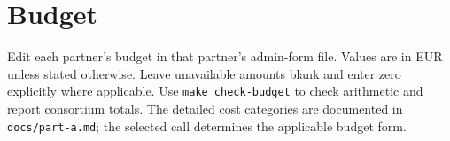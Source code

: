 \clearpage
\section{Budget}
\begin{heguidance}
Edit each partner's budget in that partner's admin-form file. Values are in EUR
unless stated otherwise. Leave unavailable amounts blank and enter zero explicitly
where applicable. Use \texttt{make check-budget} to check arithmetic and report
consortium totals. The detailed cost categories are documented in
\texttt{docs/part-a.md}; the selected call determines the applicable budget form.
\end{heguidance}
\HEPrintBudget
